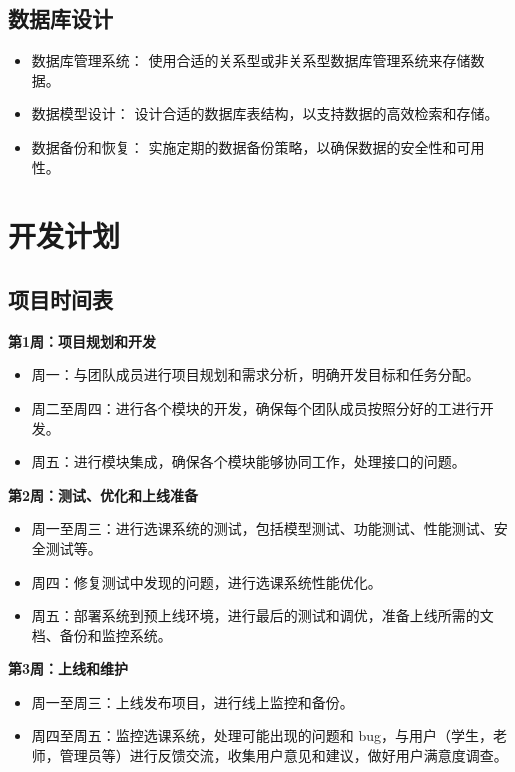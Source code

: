 \documentclass{article}
\begin{document}
\subsection{数据库设计}
\begin{itemize}
    \item 数据库管理系统： 使用合适的关系型或非关系型数据库管理系统来存储数据。
    \item 数据模型设计： 设计合适的数据库表结构，以支持数据的高效检索和存储。
    \item 数据备份和恢复： 实施定期的数据备份策略，以确保数据的安全性和可用性。
\end{itemize}

\section{开发计划}
\subsection{项目时间表}
\textbf{第1周：项目规划和开发}
\begin{itemize}
    \item 周一：与团队成员进行项目规划和需求分析，明确开发目标和任务分配。
    \item 周二至周四：进行各个模块的开发，确保每个团队成员按照分好的工进行开发。
    \item 周五：进行模块集成，确保各个模块能够协同工作，处理接口的问题。
\end{itemize}

\textbf{第2周：测试、优化和上线准备}
\begin{itemize}
    \item 周一至周三：进行选课系统的测试，包括模型测试、功能测试、性能测试、安全测试等。
    \item 周四：修复测试中发现的问题，进行选课系统性能优化。
    \item 周五：部署系统到预上线环境，进行最后的测试和调优，准备上线所需的文档、备份和监控系统。
\end{itemize}

\textbf{第3周：上线和维护}
\begin{itemize}
    \item 周一至周三：上线发布项目，进行线上监控和备份。
    \item 周四至周五：监控选课系统，处理可能出现的问题和 bug，与用户（学生，老师，管理员等）进行反馈交流，收集用户意见和建议，做好用户满意度调查。
\end{itemize}
\end{document}
